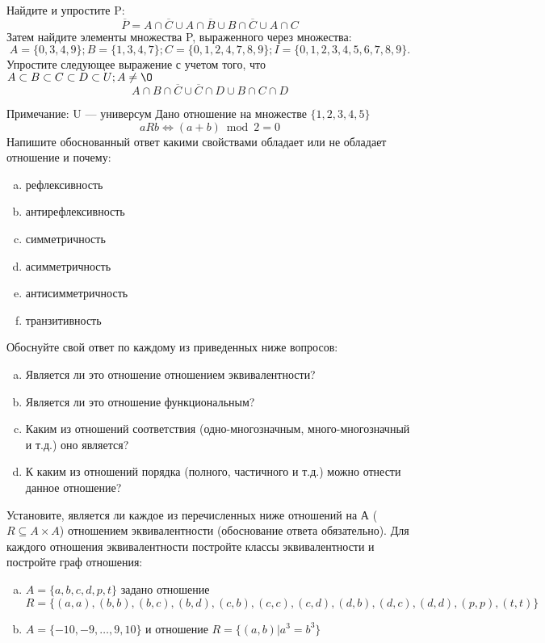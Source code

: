 \documentclass[10pt]{exam}
\begin{document}
\begin{questions}
\question
Найдите и упростите P:
\begin{equation*}
\overline{P} = A \cap \overline{C} \cup A \cap \overline{B} \cup B \cap \overline{C} \cup A \cap C
\end{equation*}
Затем найдите элементы множества P, выраженного через множества:
\begin{equation*}
A = \{0, 3, 4, 9\}; 
B = \{1, 3, 4, 7\};
C = \{0, 1, 2, 4, 7, 8, 9\};
I = \{0, 1, 2, 3, 4, 5, 6, 7, 8, 9\}.
\end{equation*}\question
Упростите следующее выражение с учетом того, что $A\subset B \subset C \subset D \subset U; A \neq \O$
\begin{equation*}
A \cap B  \cap \overline{C} \cup \overline{C} \cap D \cup B \cap C \cap D
\end{equation*}

Примечание: U — универсум\question
Дано отношение на множестве $\{1, 2, 3, 4, 5\}$ 
\begin{equation*}
aRb \iff (a+b) \bmod 2 =0
\end{equation*}
Напишите обоснованный ответ какими свойствами обладает или не обладает отношение и почему:   
\begin{enumerate} [a)]\setcounter{enumi}{0}
\item рефлексивность
\item антирефлексивность
\item симметричность
\item асимметричность
\item антисимметричность
\item транзитивность
\end{enumerate}

Обоснуйте свой ответ по каждому из приведенных ниже вопросов:
\begin{enumerate} [a)]\setcounter{enumi}{0}
    \item Является ли это отношение отношением эквивалентности?
    \item Является ли это отношение функциональным?
    \item Каким из отношений соответствия (одно-многозначным, много-многозначный и т.д.) оно является?
    \item К каким из отношений порядка (полного, частичного и т.д.) можно отнести данное отношение?
\end{enumerate}



\question
Установите, является ли каждое из перечисленных ниже отношений на А ($R \subseteq A \times A$) отношением эквивалентности (обоснование ответа обязательно). Для каждого отношения эквивалентности постройте классы 
эквивалентности и постройте граф отношения:
\begin{enumerate} [a)]\setcounter{enumi}{0}
\item $A = \{a, b, c, d, p, t\}$ задано отношение $R = \{(a, a), (b, b), (b, c), (b, d), (c, b), (c, c), (c, d), (d, b), (d, c), (d, d), (p,p), (t,t)\}$
\item $A = \{-10, -9, … , 9, 10\}$ и отношение $R = \{(a,b)|a^{3} = b^{3}\}$


\end{enumerate}
\end{questions}
\end{document}

